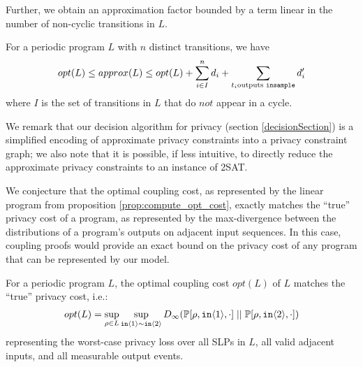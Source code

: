 Further, we obtain an approximation factor bounded by a term linear in the number of non-cyclic transitions in $L$. 

\begin{prop}
    \label{prop:approx_opt_are_close}
    For a periodic program $L$ with $n$ distinct transitions, we have 
    \[opt(L) \leq approx(L) \leq opt(L) + \sum_{i \in I }^n d_i + \sum_{t_i \text{outputs \texttt{insample}}} d_i'\]
    where $I$ is the set of transitions in $L$ that do $\textit{not}$ appear in a cycle.
\end{prop}

We remark that our decision algorithm for privacy (section \ref{decisionSection}) is a simplified encoding of approximate privacy constraints into a privacy constraint graph; we also note that it is possible, if less intuitive, to directly reduce the approximate privacy constraints to an instance of 2SAT. 

We conjecture that the optimal coupling cost, as represented by the linear program from proposition \ref{prop:compute_opt_cost}, exactly matches the ``true'' privacy cost of a program, as represented by the max-divergence between the distributions of a program's outputs on adjacent input sequences. In this case, coupling proofs would provide an exact bound on the privacy cost of any program that can be represented by our model. 

\begin{conj}
    For a periodic program $L$, the optimal coupling cost $opt(L)$ of $L$ matches the ``true'' privacy cost, i.e.:
    \begin{align*}
        opt(L) = \sup_{\rho \in L} \sup_{\texttt{in}\langle1 \rangle \sim \texttt{in}\langle2 \rangle} D_\infty(\mathbb{P}[\rho, \texttt{in}\langle1 \rangle, \cdot]\; ||\; \mathbb{P}[\rho, \texttt{in}\langle2 \rangle, \cdot])
    \end{align*}
    representing the worst-case privacy loss over all SLPs in $L$, all valid adjacent inputs, and all measurable output events.
\end{conj}
